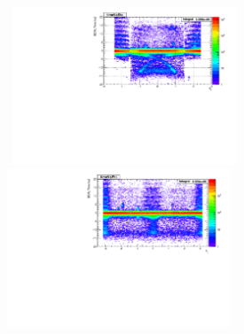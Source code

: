\vspace{5mm}
\begin{minipage}{0.90\linewidth} 
\begin{center}
\centering
\mbox{
\includegraphics[height=0.4\textwidth, width=0.5\textwidth]{THESISPLOTS/SinglePhotonDataSet-TimeVsEta.pdf}
\includegraphics[height=0.4\textwidth, width=0.5\textwidth]{THESISPLOTS/SinglePhotonDataSet-TimeVsPhi.pdf}}
\label{fig:BKGPLOTS}
\end{center}
\end{minipage}

